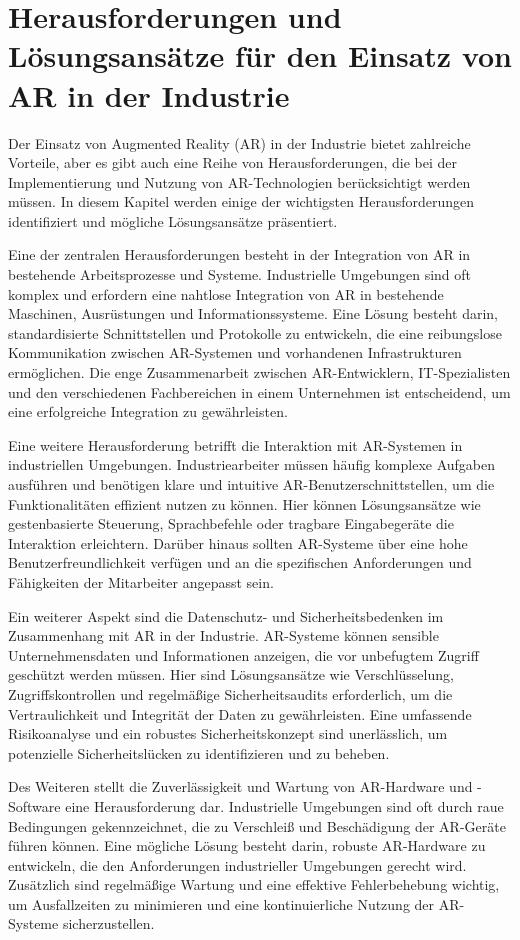 \section{Herausforderungen und Lösungsansätze für den Einsatz von AR in der Industrie}
Der Einsatz von Augmented Reality (AR) in der Industrie bietet zahlreiche
Vorteile, aber es gibt auch eine Reihe von Herausforderungen, die bei der
Implementierung und Nutzung von AR-Technologien berücksichtigt werden müssen.
In diesem Kapitel werden einige der wichtigsten Herausforderungen identifiziert
und mögliche Lösungsansätze präsentiert.

Eine der zentralen Herausforderungen besteht in der Integration von AR in
bestehende Arbeitsprozesse und Systeme. Industrielle Umgebungen sind oft
komplex und erfordern eine nahtlose Integration von AR in bestehende Maschinen,
Ausrüstungen und Informationssysteme. Eine Lösung besteht darin,
standardisierte Schnittstellen und Protokolle zu entwickeln, die eine
reibungslose Kommunikation zwischen AR-Systemen und vorhandenen Infrastrukturen
ermöglichen. Die enge Zusammenarbeit zwischen AR-Entwicklern, IT-Spezialisten
und den verschiedenen Fachbereichen in einem Unternehmen ist entscheidend, um
eine erfolgreiche Integration zu gewährleisten.

Eine weitere Herausforderung betrifft die Interaktion mit AR-Systemen in
industriellen Umgebungen. Industriearbeiter müssen häufig komplexe Aufgaben
ausführen und benötigen klare und intuitive AR-Benutzerschnittstellen, um die
Funktionalitäten effizient nutzen zu können. Hier können Lösungsansätze wie
gestenbasierte Steuerung, Sprachbefehle oder tragbare Eingabegeräte die
Interaktion erleichtern. Darüber hinaus sollten AR-Systeme über eine hohe
Benutzerfreundlichkeit verfügen und an die spezifischen Anforderungen und
Fähigkeiten der Mitarbeiter angepasst sein.

Ein weiterer Aspekt sind die Datenschutz- und Sicherheitsbedenken im
Zusammenhang mit AR in der Industrie. AR-Systeme können sensible
Unternehmensdaten und Informationen anzeigen, die vor unbefugtem Zugriff
geschützt werden müssen. Hier sind Lösungsansätze wie Verschlüsselung,
Zugriffskontrollen und regelmäßige Sicherheitsaudits erforderlich, um die
Vertraulichkeit und Integrität der Daten zu gewährleisten. Eine umfassende
Risikoanalyse und ein robustes Sicherheitskonzept sind unerlässlich, um
potenzielle Sicherheitslücken zu identifizieren und zu beheben.

Des Weiteren stellt die Zuverlässigkeit und Wartung von AR-Hardware und
-Software eine Herausforderung dar. Industrielle Umgebungen sind oft durch raue
Bedingungen gekennzeichnet, die zu Verschleiß und Beschädigung der AR-Geräte
führen können. Eine mögliche Lösung besteht darin, robuste AR-Hardware zu
entwickeln, die den Anforderungen industrieller Umgebungen gerecht wird.
Zusätzlich sind regelmäßige Wartung und eine effektive Fehlerbehebung wichtig,
um Ausfallzeiten zu minimieren und eine kontinuierliche Nutzung der AR-Systeme
sicherzustellen.